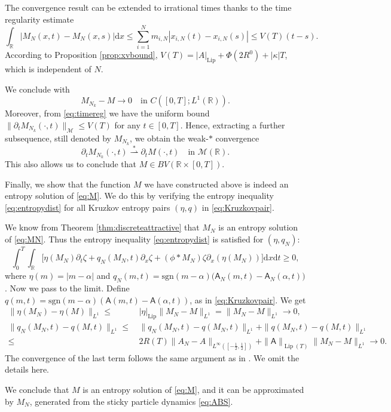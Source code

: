 \documentclass[10pt,a4paper]{amsart}
\def\R{\mathbb{R}}
\def\dd{\mathrm{d}}
\def\pa{\partial}
\def\A{\mathsf{A}}
\newcommand{\sgn}[1]{\mathrm{sgn}(#1)}
\DeclareMathOperator{\Lip}{Lip}
\def\a{\alpha}
\begin{document}
	The convergence result can be extended to irrational times thanks to the time regularity estimate
	\begin{equation}\label{eq:timereg}
		\int_\R |M_N(x,t) - M_N(x,s)|\dd x \le \sum_{i=1}^Nm_{i,N}|x_{i,N}(t)-x_{i,N}(s)| \le V(T)(t-s).
	\end{equation}
	According to Proposition \ref{prop:xvbound}, $V(T) = |A|_{\Lip} +  \Phi(2R^0) + |\kappa| T$, which is independent of $N$.
	
	We conclude with 
	\[
	M_{N_k}-M\to 0\quad \text{in}\,\, C([0,T];L^1(\R)).
	\]
	Moreover, from \eqref{eq:timereg} we have the uniform bound $\|\pa_tM_{N_k}(\cdot,t)\|_{\mathcal{M}}\leq V(T)$ for any $t\in[0,T]$. Hence, extracting a further subsequence, still denoted by $M_{N_k}$, we obtain the weak-$*$ convergence
	\[\pa_tM_{N_k}(\cdot,t)\stackrel{*}{\rightharpoonup}  \pa_tM(\cdot,t)\quad \text{in}\,\, \mathcal{M}(\R).\] 
	This also allows us to conclude that $M\in BV(\R\times[0,T])$.
	
	Finally, we show that the function $M$ we have constructed above is indeed an entropy solution of \eqref{eq:M}.  We do this by verifying the entropy inequality \eqref{eq:entropydist} for all Kruzkov entropy pairs $(\eta, q)$ in \eqref{eq:Kruzkovpair}.
	
	We know from Theorem \ref{thm:discreteattractive} that $M_N$ is an entropy solution of \eqref{eq:MN}. Thus the entropy inequality \eqref{eq:entropydist} is satisfied for $(\eta, q_N)$:
	\[
	\int_0^{T} \int_\R \Big[\eta(M_N) \pa_t \zeta + q_N(M_N,t)\pa_x \zeta +
	(\phi\ast M_N)\zeta \pa_x(\eta(M_N)) \Big] \dd x \dd t
	\ge 0,
	\]
	where $\eta(m)=|m-\a|$ and $q_N(m,t) = \sgn{m - \alpha}\big(\A_N(m,t) - \A_N(\alpha,t)\big)$.
	Now we pass to the limit. Define $q(m,t) = \sgn{m-\a}(\A(m,t) -
	\A(\alpha,t))$, as in \eqref{eq:Kruzkovpair}. We get
	\begin{align*}
		\|\eta(M_N)-\eta(M)\|_{L^1}\leq
		&\,|\eta|_{\Lip}\|M_N-M\|_{L^1}=\|M_N-M\|_{L^1}\to0,\\
		\|q_N(M_N,t)-q(M,t)\|_{L^1}\leq &\,\|q_N(M_N,t)-q(M_N,t)\|_{L^1}+\|q(M_N,t)-q(M,t)\|_{L^1}\\
		\leq &\, 2R(T)\|A_N-A\|_{L^\infty([-\frac12,\frac12])}+\|\A\|_{\Lip(T)}\|M_N-M\|_{L^1}\to0.
	\end{align*}
	The convergence of the last term follows the same argument as in \cite{leslie2023sticky}. We omit the details here.
	
	We conclude that $M$ is an entropy solution of \eqref{eq:M}, and it can be approximated by $M_N$, generated from the sticky particle dynamics \eqref{eq:ABS}. %
	
\end{document}
